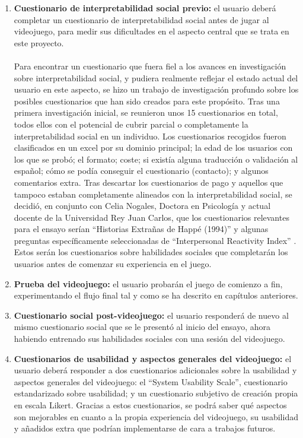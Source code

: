 \documentclass[12pt,twoside,titlepage]{report}
\begin{document}
\begin{enumerate}[label=\textbf{\arabic*.}, leftmargin=1.5cm, itemsep=0.5em]
  \item \textbf{Cuestionario de interpretabilidad social previo:} el usuario deberá completar un cuestionario de interpretabilidad social antes de jugar al videojuego, para medir sus dificultades en el aspecto central que se trata en este proyecto.
  \\\\
  Para encontrar un cuestionario que fuera fiel a los avances en investigación sobre interpretabilidad social, y pudiera realmente reflejar el estado actual del usuario en este aspecto, se hizo un trabajo de investigación profundo sobre los posibles cuestionarios que han sido creados para este propósito.
  Tras una primera investigación inicial, se reunieron unos 15 cuestionarios en total, todos ellos con el potencial de cubrir parcial o completamente la interpretabilidad social en un individuo.
  Los cuestionarios recogidos fueron clasificados en un excel por su dominio principal; la edad de los usuarios con los que se probó; el formato; coste; si existía alguna traducción o validación al español; cómo se podía conseguir el cuestionario (contacto); y algunos comentarios extra.
  Tras descartar los cuestionarios de pago y aquellos que tampoco estaban completamente alineados con la interpretabilidad social, se decidió, en conjunto con Celia Nogales, Doctora en Psicología y actual docente de la Universidad Rey Juan Carlos, que los cuestionarios relevantes para el ensayo serían ``Historias Extrañas de Happé (1994)'' \parencite{happe1994} y algunas preguntas específicamente seleccionadas de ``Interpersonal Reactivity Index'' \parencite{davis1983}.
  Estos serán los cuestionarios sobre habilidades sociales que completarán los usuarios antes de comenzar su experiencia en el juego.
  \item \textbf{Prueba del videojuego:} el usuario probarán el juego de comienzo a fin, experimentando el flujo final tal y como se ha descrito en capítulos anteriores.
  \item \textbf{Cuestionario social post-videojuego:} el usuario responderá de nuevo al mismo cuestionario social que se le presentó al inicio del ensayo, ahora habiendo entrenado sus habilidades sociales con una sesión del videojuego.
  \item \textbf{Cuestionarios de usabilidad y aspectos generales del videojuego:} el usuario deberá responder a dos cuestionarios adicionales sobre la usabilidad y aspectos generales del videojuego: el ``System Usability Scale'', cuestionario estandarizado sobre usabilidad; y un cuestionario subjetivo de creación propia en escala Likert.
  Gracias a estos cuestionarios, se podrá saber qué aspectos son mejorables en cuanto a la propia experiencia del videojuego, su usabilidad y añadidos extra que podrían implementarse de cara a trabajos futuros.
\end{enumerate}
\end{document}
